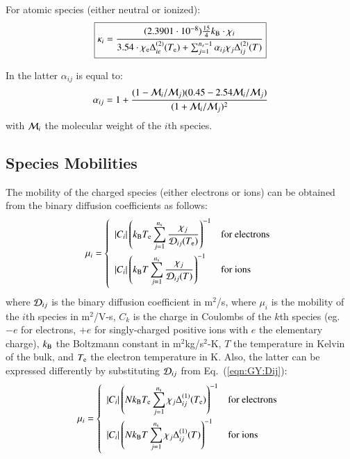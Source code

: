 \documentclass{warpdoc}
\newcommand{\alb}{\vspace{0.1cm}\\} %
\newcommand{\mfd}{\displaystyle}
\newcommand\frameeqn[1]{\fbox{$\displaystyle #1$}}
\begin{document}
For atomic species (either neutral or ionized):
%
\begin{equation}
\frameeqn{
\kappa_i = \frac{(2.3901\cdot10^{-8}) \frac{15}{4} k_{\rm B}  \cdot \chi_i}{3.54\cdot \chi_{\rm e} \Delta_{ie}^{(2)}(T_{\rm e})+ \sum_{j=1}^{n_s-1} \alpha_{ij} \chi_j \Delta_{ij}^{(2)}(T) }
}
\end{equation}
%

In the latter $\alpha_{ij}$ is equal to:
%
\begin{equation}
\alpha_{ij}=1+ \frac{(1- {\cal M}_i/{\cal M}_j)(0.45-2.54 {\cal M}_i / {\cal M}_j)}{(1+ {\cal M}_i/{\cal M}_j)^2}
\end{equation}
%
with ${\cal M}_i$ the molecular weight of the $i$th species.


\subsection{Species Mobilities}

The mobility of the charged species (either electrons or ions) can be obtained from the binary diffusion coefficients as follows:
%
\begin{equation}
 \mu_i= \left\{\begin{array}{ll}
   \mfd  |C_i| \left( k_{\rm B} T_{\rm e} \sum_{j=1}^{n_{\rm s}} \frac{\chi_j}{{\cal D}_{ij}(T_{\rm e})}\right)^{-1} & \textrm{for electrons} \alb
    \mfd  |C_i| \left( k_{\rm B} T \sum_{j=1}^{n_{\rm s}} \frac{\chi_j}{{\cal D}_{ij}(T)}\right)^{-1} & \textrm{for ions} \alb
 \end{array} \right.
\end{equation}
%
where ${\cal D}_{ij}$ is the binary diffusion coefficient in m$^2$/s, where $\mu_i$ is the mobility of the $i$th species in m$^2$/V-s, $C_k$ is the charge in Coulombs of the $k$th species (eg.\ $-e$ for electrons, $+e$ for singly-charged positive ions with $e$ the elementary charge), $k_{\rm B}$ the Boltzmann constant in m$^2$kg/s$^2$-K, $T$ the temperature in Kelvin of the bulk, and $T_{\rm e}$ the electron temperature in K.
Also, the latter can be expressed differently by substituting ${\cal D}_{ij}$ from Eq.\ (\ref{eqn:GY:Dij}):
%
\begin{equation}
 \mu_i= \left\{\begin{array}{ll}
   \mfd  |C_i| \left( N k_{\rm B} T_{\rm e} \sum_{j=1}^{n_{\rm s}} \chi_j  \Delta_{ij}^{(1)}(T_{\rm e}) \right)^{-1} & \textrm{for electrons} \alb
    \mfd  |C_i| \left( N k_{\rm B} T \sum_{j=1}^{n_{\rm s}} \chi_j  \Delta_{ij}^{(1)}(T) \right)^{-1} & \textrm{for ions} \alb
 \end{array} \right.
\end{equation}
%
\end{document}

